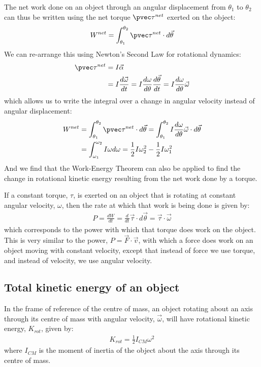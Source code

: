 The net work done on an object through an angular displacement from $\theta_1$ to $\theta_2$ can thus be written using the net torque $\pvec \tau^{net}$ exerted on the object:
\begin{align*}
W^{net} = \int_{\theta_1}^{\theta_2}\pvec\tau^{net}\cdot d\vec \theta
\end{align*}
We can re-arrange this using Newton's Second Law for rotational dynamics:
\begin{align*}
\pvec\tau^{net} &= I \vec\alpha\\
&= I \frac{d\vec\omega}{dt} =  I \frac{d\omega}{d\theta}\frac{d\vec\theta}{dt}=I \frac{d\omega}{d\theta} \vec\omega
\end{align*}
which allows us to write the integral over a change in angular velocity instead of angular displacement:
\begin{align*}
W^{net} &= \int_{\theta_1}^{\theta_2}\pvec\tau^{net}\cdot d\vec \theta =  \int_{\theta_1}^{\theta_2}I \frac{d\omega}{d\theta} \vec\omega \cdot d\vec \theta\\
&=\int_{\omega_1}^{\omega_2}I \omega d\omega = \frac{1}{2}I\omega_2^2 - \frac{1}{2}I\omega_1^2
\end{align*}
And we find that the Work-Energy Theorem can also be applied to find the change in rotational kinetic energy resulting from the net work done by a torque.

If a constant torque, $\tau$, is exerted on an object that is rotating at constant angular velocity, $\omega$, then the rate at which that work  is being done is given by:
\begin{align*}
P = \frac{dW}{dt} = \frac{d}{dt} \vec \tau \cdot d\vec\theta = \vec \tau \cdot \vec\omega
\end{align*}
which corresponds to the power with which that torque does work on the object. This is very similar to the power, $P=\vec F\cdot \vec v$, with which a force does work on an object moving with constant velocity, except that instead of force we use torque, and instead of velocity, we use angular velocity. 

\subsection{Total kinetic energy of an object}
In the frame of reference of the centre of mass, an object rotating about an axis through its centre of mass with angular velocity, $\vec \omega$, will have rotational kinetic energy, $K_{rot}$, given by:
\begin{align*}
K_{rot}=\frac{1}{2}I_{CM}\omega^2
\end{align*}
where $I_{CM}$ is the moment of inertia of the object about the axis through its centre of mass. 

